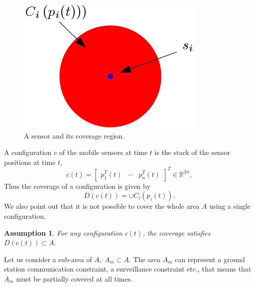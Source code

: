 \documentclass{iacas}
\newcommand{\bmat}[1]{\begin{bmatrix}#1\end{bmatrix}}
\newtheorem{assumption}{Assumption}
\begin{document}
\begin{figure}[H]
\centering
\includegraphics[scale=0.6]{figures/problem-def/sensor-and-coverage.png}
\caption{A sensor and its coverage region.}%
\label{fig:coverage region exmaple}
\end{figure}

A configuration $c$ of the mobile sensors at time $t$ is the stack of the sensor positions at time $t$,
\begin{equation}
c\left(t\right) = \bmat{
p_{1}^{T}\left(t\right)&\cdots&p_{n}^{T}\left(t\right)}^{T}\in\mathbb{R}^{2n},
\label{eq:configuration definition}
\end{equation}
Thus the coverage of a configuration is given by
\begin{equation*}
D\left( c\left( t \right) \right) = \cup C_i(p_i(t)).
\end{equation*}
We also point out that it is not possible to cover the whole area $A$ using a single configuration.
\begin{assumption}
For any configuration $c(t)$, the coverage satisfies $D\left( c\left( t \right) \right) \subset A$. %
\label{assump: no full coverage}
\end{assumption}

Let us consider a sub-area of $A,\; A_m \subset A$. The area $A_m$ can represent a ground station communication constraint, a surveillance constraint etc., that means that $A_m$ must be partially covered at all times.
\end{document}
